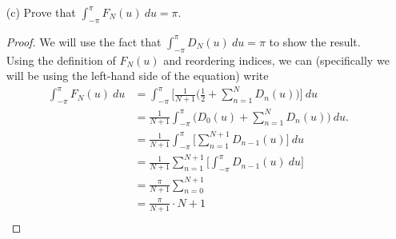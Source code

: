 \begin{enumerate}
\begin{proof}[Solution]
        \[  \Big| \frac{ 1 }{ 2(N+1) }  \Big| < \varepsilon.  \] Furthermore, the sine function is bounded by \(  1  \). Hence, we can write the following
        \begin{align*}
            \Big| \frac{ 1 }{ 2(N+1) } \Big[ \frac{ \sin((N+1)\frac{ u }{ 2 } ) }{ \sin(u/2) } \Big]^{2} \Big| &\leq \Big| \frac{ 1 }{ 2(N+1) }  \Big| \cdot \Big| \frac{ \sin((N+1) \frac{ u }{ 2 } ) }{ \sin(u/2)  }  \Big|^{2}  \\ 
                                                                                                               &\leq \frac{ 1 }{ 2(N+1) } \\
                                                                                                               &< \varepsilon.
        \end{align*}
        Hence, we must also have 
        \[  \frac{ 1 }{ 2(N+1)  } \Big[\frac{ \sin((N+1)\frac{ u }{ 2 } ) }{ \sin(u/2) } \Big]^{2} \to 0  \] uniformly.
        \end{proof}
    \item[(c)] Prove that \( \int_{ -\pi  }^{ \pi  } F_{N}(u)  \ du = \pi. \)
        \begin{proof}
        We will use the fact that \( \int_{ -\pi }^{ \pi } D_{N}(u)  \ du = \pi \) to show the result. Using the definition of \( F_{N}(u)  \) and reordering indices, we can (specifically we will be using the left-hand side of the equation) write 
        \begin{align*}
            \int_{ -\pi  }^{ \pi  } F_{N}(u)   \ du &= \int_{ -\pi  }^{ \pi  } \Big[ \frac{ 1 }{ N+1 } \Big( \frac{ 1 }{ 2 } + \sum_{ n=1 }^{ N } D_{n}(u) \Big) \Big]   \ du \\
                                                    &= \frac{ 1 }{ N+1 } \int_{ -\pi  }^{ \pi  }  \Big( D_{0}(u) + \sum_{ n=1 }^{ N } D_{n}(u) \Big) \ du. \\
                                                    &= \frac{ 1 }{ N+1 }  \int_{ -\pi  }^{ \pi  } \Big[ \sum_{ n=1 }^{ N+1 } D_{n-1}(u) \Big] \ du \\
                                                    &= \frac{ 1 }{ N+1 } \sum_{ n=1}^{ N+1 } \Big[ \int_{ -\pi }^{ \pi } D_{n-1}(u)  \ du \Big] \\
                                                    &= \frac{ \pi }{ N+1 } \sum_{ n=0 }^{ N+1 } \\
                                                    &= \frac{ \pi  }{ N+1  } \cdot N+1 \\

\end{align*}
\end{proof}
\end{enumerate}

